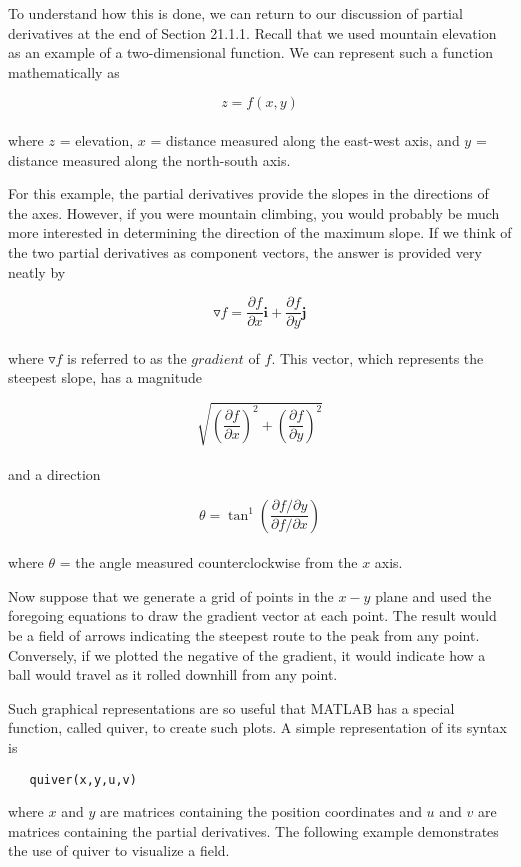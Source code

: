 \documentclass[../main.tex]{subfiles}
\begin{document}
To understand how this is done, we can return to our discussion of partial derivatives
at the end of Section 21.1.1. Recall that we used mountain elevation as an example of a
two-dimensional function. We can represent such a function mathematically as

	$$z=f(x,y)$$\\
where $z$ = elevation, $x$ = distance measured along the east-west axis, and $y$ = distance
measured along the north-south axis.

For this example, the partial derivatives provide the slopes in the directions of the
axes. However, if you were mountain climbing, you would probably be much more interested in determining the direction of the maximum slope. If we think of the two partial derivatives as component vectors, the answer is provided very neatly by 

	$$\triangledown f = \dfrac{\partial f}{\partial x} \textbf{i} + \dfrac{\partial f}{\partial y} \textbf{j}$$\\
where $\triangledown f$ is referred to as the $gradient$ of $f$. This vector, which represents the steepest
slope, has a magnitude

	$$\sqrt{\left(\dfrac{\partial f}{\partial x} \right)^{2} + \left( \dfrac{\partial f}{\partial y} \right)^{2}}$$\\
and a direction

	$$\theta = \tan^{1} \left( \dfrac{\partial f/ \partial y}{\partial f / \partial x} \right)$$\\
where $\theta$ = the angle measured counterclockwise from the $x$ axis. 

Now suppose that we generate a grid of points in the $x-y$ plane and used the foregoing
equations to draw the gradient vector at each point. The result would be a field of arrows
indicating the steepest route to the peak from any point. Conversely, if we plotted the negative of the gradient, it would indicate how a ball would travel as it rolled downhill from
any point.

Such graphical representations are so useful that MATLAB has a special function,
called quiver, to create such plots. A simple representation of its syntax is
\begin{verbatim}
   quiver(x,y,u,v)
\end{verbatim}
where $x$ and $y$ are matrices containing the position coordinates and $u$ and $v$ are matrices
containing the partial derivatives. The following example demonstrates the use of quiver
to visualize a field.
\end{document}
